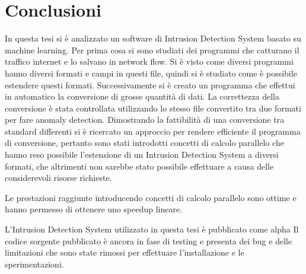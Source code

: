 \documentclass[../main.tex]{subfiles}
\begin{document}
\chapter{Conclusioni}
In questa tesi si è analizzato un software di Intrusion Detection System basato su machine learning. Per prima cosa si sono studiati dei programmi che catturano il traffico internet e lo salvano in network flow. Si è visto come diversi programmi hanno diversi formati e campi in questi file, quindi si è studiato come è possibile estendere questi formati. Successivamente si è creato un programma che effettui in automatico la conversione di grosse quantità di dati. La correttezza della conversione è stata controllata utilizzando lo stesso file convertito tra due formati per fare anomaly detection.
Dimostrando la fattibilità di una conversione tra standard differenti si è ricercato un approccio per rendere efficiente il programma di conversione, pertanto sono stati introdotti concetti di calcolo parallelo che hanno reso possibile l'estensione di un Intrusion Detection System a diversi formati, che altrimenti non sarebbe stato possibile effettuare a causa delle considerevoli risorse richieste.

Le prestazioni raggiunte introducendo concetti di calcolo parallelo sono ottime e hanno permesso di ottenere uno speedup lineare.

L'Intrusion Detection System utilizzato in questa tesi è pubblicato come alpha  Il codice sorgente pubblicato è ancora in fase di testing e presenta dei bug e delle limitazioni che sono state rimossi per effettuare l'installazione e le sperimentazioni.
\end{document}
